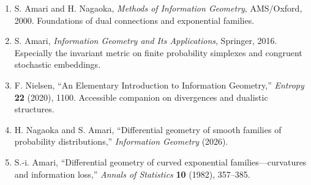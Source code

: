 \documentclass[11pt]{article}
\theoremstyle{definition}\newtheorem{definition}[theorem]{Definition}\newtheorem{exercise}{Problem}[section]
\begin{document}
\begin{enumerate}
\item S. Amari and H. Nagaoka, \emph{Methods of Information Geometry}, AMS/Oxford, 2000. Foundations of dual connections and exponential families.
\item S. Amari, \emph{Information Geometry and Its Applications}, Springer, 2016. Especially the invariant metric on finite probability simplexes and congruent stochastic embeddings.
\item F. Nielsen, ``An Elementary Introduction to Information Geometry,'' \emph{Entropy} \textbf{22} (2020), 1100. Accessible companion on divergences and dualistic structures.
\item H. Nagaoka and S. Amari, ``Differential geometry of smooth families of probability distributions,'' \emph{Information Geometry} (2026).
\item S.-i. Amari, ``Differential geometry of curved exponential families---curvatures and information loss,'' \emph{Annals of Statistics} \textbf{10} (1982), 357--385.
\end{enumerate}
\end{document}
